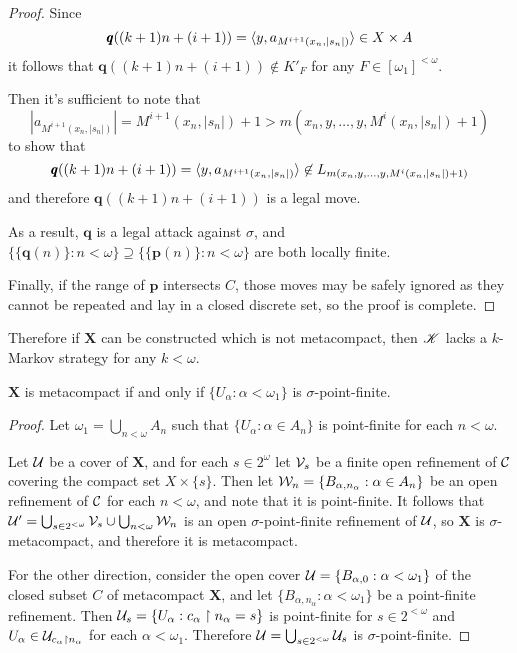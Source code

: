 \begin{proof}
  Since
    \[
      \pmb q((k+1)n+(i+1))
        =
      \langle y, a_{M^{i+1}(x_n,|s_n|)}\rangle
        \in
      X\times A
    \]
  it follows that $\pmb q((k+1)n+(i+1))\not\in K'_F$ for any
  $F\in[\omega_1]^{<\omega}$.

  Then it's sufficient to note that
    \[
      |a_{M^{i+1}(x_n,|s_n|)}|
        =
      M^{i+1}(x_n,|s_n|) + 1
        >
      m(x_n,y,\dots,y,M^i(x_n,|s_n|)+1)
    \]
  to show that
    \[
      \pmb q((k+1)n+(i+1))
        =
      \langle y, a_{M^{i+1}(x_n,|s_n|)}\rangle
        \not\in
      L_{m(x_n,y,\dots,y,M^i(x_n,|s_n|)+1)}
    \]
  and therefore $\pmb q((k+1)n+(i+1))$ is a legal move.

  As a result, $\pmb q$ is a legal attack against $\sigma$, and
  $\{\{\pmb q(n)\}:n<\omega\}\supseteq\{\{\pmb p(n)\}:n<\omega\}$ are
  both locally finite.

  Finally, if the range of $\pmb p$ intersects $C$, those moves may be safely
  ignored as they cannot be repeated and lay in a closed discrete set,
  so the proof is complete.
\end{proof}

Therefore if $\pmb X$ can be constructed which is not metacompact, then
$\mathscr{K}$ lacks a $k$-Markov strategy for any $k<\omega$.

\begin{thm}
  $\pmb X$ is metacompact
    if and only if
  $\{U_\alpha:\alpha<\omega_1\}$ is $\sigma$-point-finite.
\end{thm}

\begin{proof}
  Let $\omega_1=\bigcup_{n<\omega}A_n$ such that
  $\{U_\alpha:\alpha\in A_n\}$ is point-finite for each $n<\omega$.

  Let $\mathcal{U}$ be a cover of $\pmb X$, and for each $s\in 2^\omega$
  let $\mathcal{V}_s$ be a finite open refinement of $\mathcal{C}$ covering the compact
  set $X\times\{s\}$. Then let $\mathcal{W}_n = \{B_{\alpha,n_\alpha}:\alpha\in A_n\}$
  be an open refinement of $\mathcal{C}$ for each $n<\omega$, and note that it
  is point-finite. It follows that
  $\mathcal{U}' = \bigcup_{s\in 2^{<\omega}} \mathcal{V}_s \cup \bigcup_{n<\omega} \mathcal{W}_n$
  is an open $\sigma$-point-finite refinement of $\mathcal{U}$, so $\pmb X$
  is $\sigma$-metacompact, and therefore it is metacompact.

  For the other direction, consider the open cover
  $\mathcal{U} = \{B_{\alpha,0}:\alpha<\omega_1\}$ of the closed subset $C$ of
  metacompact $\pmb X$, and let $\{B_{\alpha,n_\alpha}:\alpha<\omega_1\}$ be
  a point-finite refinement. Then
  $\mathcal{U}_s = \{ U_\alpha : c_\alpha \restriction n_\alpha = s\}$ is
  point-finite for $s\in 2^{<\omega}$ and
  $U_\alpha\in\mathcal{U}_{c_\alpha\restriction n_\alpha}$ for each $\alpha<\omega_1$.
  Therefore $\mathcal{U} = \bigcup_{s\in 2^{<\omega}} \mathcal{U}_s$ is
  $\sigma$-point-finite.
\end{proof}

